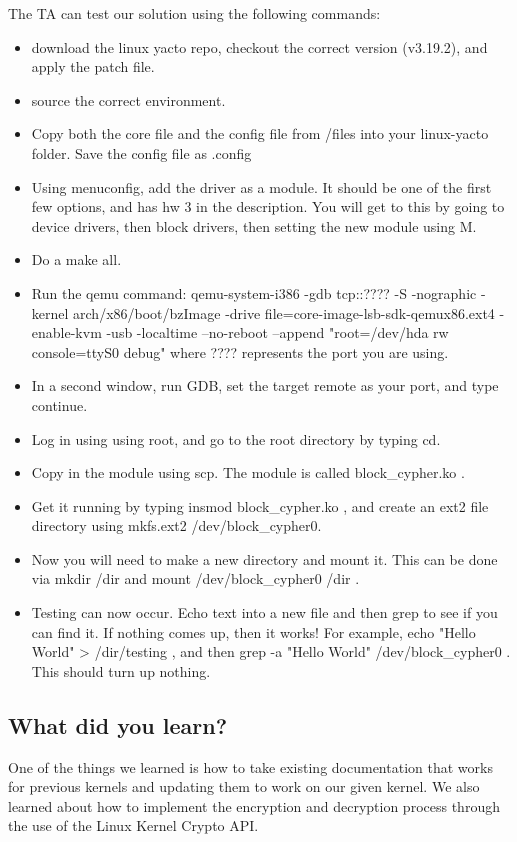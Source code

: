 \documentclass[letterpaper,onecolumn,11pt,titlepage]{IEEEtran}
\begin{document}
\par The TA can test our solution using the following commands:
\begin{itemize}
\item download the linux yacto repo, checkout the correct version (v3.19.2), and apply the patch file.
\item source the correct environment.
\item Copy both the core file and the config file from /files into your linux-yacto folder. Save the config file as .config
\item Using menuconfig, add the driver as a module. It should be one of the first few options, and has hw 3 in the description. You will get to this by going to device drivers, then block drivers, then setting the new module using M.
\item Do a make all.
\item Run the qemu command: qemu-system-i386 -gdb tcp::???? -S -nographic -kernel arch/x86/boot/bzImage -drive file=core-image-lsb-sdk-qemux86.ext4 -enable-kvm -usb -localtime --no-reboot --append "root=/dev/hda rw console=ttyS0 debug" where ???? represents the port you are using.
\item In a second window, run GDB, set the target remote as your port, and type continue.
\item Log in using using root, and go to the root directory by typing cd.
\item Copy in the module using scp. The module is called block\_cypher.ko .
\item Get it running by typing insmod block\_cypher.ko , and create an ext2 file directory using mkfs.ext2 /dev/block\_cypher0.
\item Now you will need to make a new directory and mount it. This can be done via mkdir /dir and mount /dev/block\_cypher0 /dir .
\item Testing can now occur. Echo text into a new file and then grep to see if you can find it. If nothing comes up, then it works! For example, echo "Hello World" > /dir/testing , and then grep -a "Hello World" /dev/block\_cypher0 . This should turn up nothing.
\end{itemize}

\subsection{What did you learn?}
\par One of the things we learned is how to take existing documentation that works for previous kernels and updating them to work on our given kernel. We also learned about how to implement the encryption and decryption process through the use of the Linux Kernel Crypto API.
\end{document}
